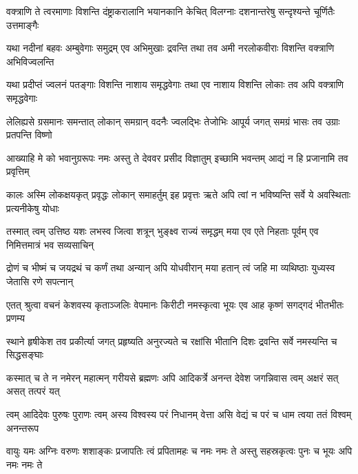 \fourlineindentedshloka
{वक्त्राणि ते त्वरमाणाः विशन्ति}
{दंष्ट्राकरालानि भयानकानि}
{केचित् विलग्नाः दशनान्तरेषु}
{सन्दृश्यन्ते चूर्णितैः उत्तमाङ्गैः}%

\fourlineindentedshloka
{यथा नदीनां बहवः अम्बुवेगाः}
{समुद्रम् एव अभिमुखाः द्रवन्ति}
{तथा तव अमी नरलोकवीराः}
{विशन्ति वक्त्राणि अभिविज्वलन्ति}%

\fourlineindentedshloka
{यथा प्रदीप्तं ज्वलनं पतङ्गाः}
{विशन्ति नाशाय समृद्धवेगाः}
{तथा एव नाशाय विशन्ति लोकाः}
{तव अपि वक्त्राणि समृद्धवेगाः}%

\fourlineindentedshloka
{लेलिह्यसे ग्रसमानः समन्तात्}
{लोकान् समग्रान् वदनैः ज्वलद्भिः}
{तेजोभिः आपूर्य जगत् समग्रं}
{भासः तव उग्राः प्रतपन्ति विष्णो}%

\fourlineindentedshloka
{आख्याहि मे को भवानुग्ररूपः}
{नमः अस्तु ते देववर प्रसीद}
{विज्ञातुम् इच्छामि भवन्तम् आद्यं}
{न हि प्रजानामि तव प्रवृत्तिम्}%


\fourlineindentedshloka
{कालः अस्मि लोकक्षयकृत् प्रवृद्धः}
{लोकान् समाहर्तुम् इह प्रवृत्तः}
{ऋते अपि त्वां न भविष्यन्ति सर्वे}
{ये अवस्थिताः प्रत्यनीकेषु योधाः}%

\fourlineindentedshloka
{तस्मात् त्वम् उत्तिष्ठ यशः लभस्व}
{जित्वा शत्रून् भुङ्क्ष्व राज्यं समृद्धम्}
{मया एव एते निहताः पूर्वम् एव}
{निमित्तमात्रं भव सव्यसाचिन्}%

\fourlineindentedshloka
{द्रोणं च भीष्मं च जयद्रथं च}
{कर्णं तथा अन्यान् अपि योधवीरान्}
{मया हतान् त्वं जहि मा व्यथिष्ठाः}
{युध्यस्व जेतासि रणे सपत्नान्}%


\fourlineindentedshloka
{एतत् श्रुत्वा वचनं केशवस्य}
{कृताञ्जलिः वेपमानः किरीटी}
{नमस्कृत्वा भूयः एव आह कृष्णं}
{सगद्गदं भीतभीतः प्रणम्य}%


\fourlineindentedshloka
{स्थाने हृषीकेश तव प्रकीर्त्या}
{जगत् प्रहृष्यति अनुरज्यते च}
{रक्षांसि भीतानि दिशः द्रवन्ति}
{सर्वे नमस्यन्ति च सिद्धसङ्घाः}%

\fourlineindentedshloka
{कस्मात् च ते न नमेरन् महात्मन्}
{गरीयसे ब्रह्मणः अपि आदिकर्त्रे}
{अनन्त देवेश जगन्निवास}
{त्वम् अक्षरं सत् असत् तत्परं यत्}%

\fourlineindentedshloka
{त्वम् आदिदेवः पुरुषः पुराणः}
{त्वम् अस्य विश्वस्य परं निधानम्}
{वेत्ता असि वेद्यं च परं च धाम}
{त्वया ततं विश्वम् अनन्तरूप}%

\fourlineindentedshloka
{वायुः यमः अग्निः वरुणः शशाङ्कः}
{प्रजापतिः त्वं प्रपितामहः च}
{नमः नमः ते अस्तु सहस्रकृत्वः}
{पुनः च भूयः अपि नमः नमः ते}%


